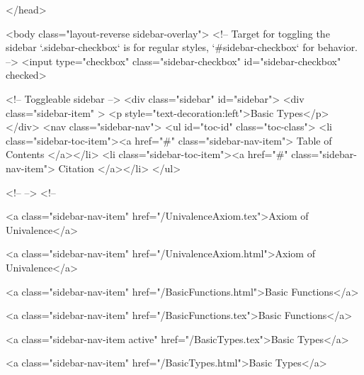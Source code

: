   
</head>




  <body class="layout-reverse sidebar-overlay">
    <!-- Target for toggling the sidebar `.sidebar-checkbox` is for regular
     styles, `#sidebar-checkbox` for behavior. -->
<input type="checkbox" class="sidebar-checkbox" id="sidebar-checkbox" checked>

<!-- Toggleable sidebar -->
<div class="sidebar" id="sidebar">
  <div class="sidebar-item" >
    <p style="text-decoration:left">Basic Types</p>
  </div>
  <nav class="sidebar-nav">
    <ul id="toc-id" class="toc-class">
  <li class="sidebar-toc-item"><a href="#" class="sidebar-nav-item"> Table of Contents </a></li>
  <li class="sidebar-toc-item"><a href="#" class="sidebar-nav-item"> Citation </a></li>
</ul>


    <!--  -->
    <!-- 
      
    
      
    
      
    
      
    
      
        
      
    
      
        
          <a class="sidebar-nav-item" href="/UnivalenceAxiom.tex">Axiom of Univalence</a>
        
      
    
      
        
          <a class="sidebar-nav-item" href="/UnivalenceAxiom.html">Axiom of Univalence</a>
        
      
    
      
        
          <a class="sidebar-nav-item" href="/BasicFunctions.html">Basic Functions</a>
        
      
    
      
        
          <a class="sidebar-nav-item" href="/BasicFunctions.tex">Basic Functions</a>
        
      
    
      
        
          <a class="sidebar-nav-item active" href="/BasicTypes.tex">Basic Types</a>
        
      
    
      
        
          <a class="sidebar-nav-item" href="/BasicTypes.html">Basic Types</a>
        
      
    

